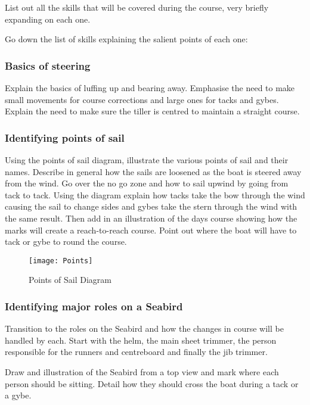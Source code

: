 \documentclass[12pt]{scrartcl}
\begin{document}
List out all the skills that will be covered during the course, very briefly expanding on each one.

Go down the list of skills explaining the salient points of each one:

\subsubsection{Basics of steering} \label{subsubsection:basics of steering}

Explain the basics of luffing up and bearing away. Emphasise the need to make small movements for course corrections and large ones for tacks and gybes. Explain the need to make sure the tiller is centred to maintain a straight course.

\subsubsection{Identifying points of sail} \label{subsubsec:points of sail}

Using the points of sail diagram, illustrate the various points of sail and their names. Describe in general how the sails are loosened as the boat is steered away from the wind. Go over the no go zone and how to sail upwind by going from tack to tack. Using the diagram explain how tacks take the bow through the wind causing the sail to change sides and gybes take the stern through the wind with the same result. Then add in an illustration of the days course showing how the marks will create a reach-to-reach course. Point out where the boat will have to tack or gybe to round the course.

\label{fig:points of sail}
\begin{figure}[H]
	\centering
	\texttt{[image: Points]}
	\caption{Points of Sail Diagram}
\end{figure}

\subsubsection{Identifying major roles on a Seabird} \label{subsubsec:identifying major roles}

Transition to the roles on the Seabird and how the changes in course will be handled by each. Start with the helm, the main sheet trimmer, the person responsible for the runners and centreboard and finally the jib trimmer.

Draw and illustration of the Seabird from a top view and mark where each person should be sitting. Detail how they should cross the boat during a tack or a gybe.
\end{document}
